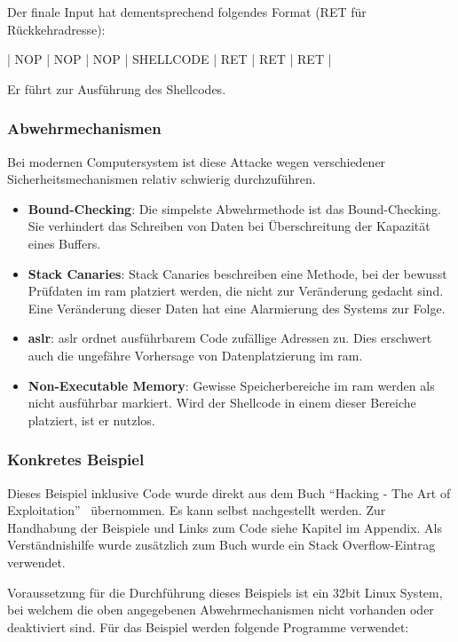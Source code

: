 \documentclass[11pt, a4paper]{article}
\begin{document}
Der finale Input hat dementsprechend folgendes Format (RET für Rückkehradresse):
\newline
\begin{center}
	\centerline{| NOP | NOP | NOP | SHELLCODE | RET | RET | RET |}
\end{center}
Er führt zur Ausführung des Shellcodes.

\subsubsection{Abwehrmechanismen}\label{subsubsec:abwehrbuffer-overflow}
Bei modernen Computersystem ist diese Attacke wegen verschiedener Sicherheitsmechanismen relativ schwierig durchzuführen.

\begin{itemize}
	\item \textbf{Bound-Checking}: Die simpelste Abwehrmethode ist das Bound-Checking. Sie verhindert das Schreiben von Daten bei Überschreitung der Kapazität eines Buffers.
	\item \textbf{Stack Canaries}: Stack Canaries beschreiben eine Methode, bei der bewusst Prüfdaten im \gls{ram} platziert werden, die nicht zur Veränderung gedacht sind. Eine Veränderung dieser Daten hat eine Alarmierung des Systems zur Folge.~\cite{StackCan84:online}
	\item \textbf{\gls{aslr}}: \gls{aslr} ordnet ausführbarem Code zufällige Adressen zu. Dies erschwert auch die ungefähre Vorhersage von Datenplatzierung im \gls{ram}.~\cite{Whatisad68:online}
	\item \textbf{Non-Executable Memory}: Gewisse Speicherbereiche im \gls{ram} werden als nicht ausführbar markiert. Wird der Shellcode in einem dieser Bereiche platziert, ist er nutzlos.
\end{itemize}


\subsubsection{Konkretes Beispiel}\label{subsubsec:bspbuffer-overflow}
Dieses Beispiel inklusive Code wurde direkt aus dem Buch ``Hacking - The Art of Exploitation''~\cite{erickson2008hacking} übernommen. Es kann selbst nachgestellt werden. Zur Handhabung der Beispiele und Links zum Code siehe Kapitel  im Appendix. Als Ver­ständ­nis­hil­fe wurde zusätzlich zum Buch wurde ein Stack Overflow-Eintrag verwendet.~\cite{stacko:online}

Voraussetzung für die Durchführung dieses Beispiels ist ein 32bit Linux System, bei welchem die oben angegebenen Abwehrmechanismen nicht vorhanden oder deaktiviert sind. Für das Beispiel werden folgende Programme verwendet:
\end{document}
